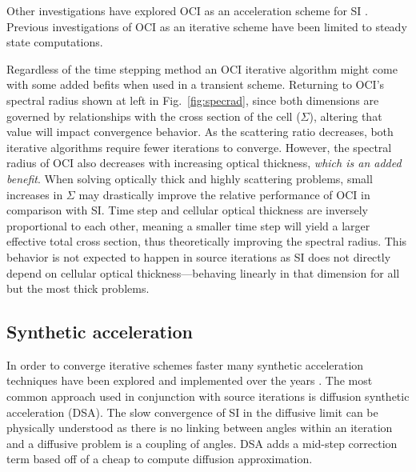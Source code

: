Other investigations have explored OCI as an acceleration scheme for SI \cite{anistratov_iterative_2015, hoagland_hybrid_2021}. %
Previous investigations of OCI as an iterative scheme have been limited to steady state computations.

Regardless of the time stepping method an OCI iterative algorithm might come with some added befits when used in a transient scheme.
Returning to OCI's spectral radius shown at left in Fig.~\ref{fig:specrad}, since both dimensions are governed by relationships with the cross section of the cell ($\Sigma$), altering that value will impact convergence behavior. 
As the scattering ratio decreases, both iterative algorithms require fewer iterations to converge.
However, the spectral radius of OCI also decreases with increasing optical thickness, \textit{which is an added benefit}.
When solving optically thick and highly scattering problems, small increases in $\Sigma$ may drastically improve the relative performance of OCI in comparison with SI.
Time step and cellular optical thickness are inversely proportional to each other, meaning a smaller time step will yield a larger effective total cross section, thus theoretically improving the spectral radius.
This behavior is not expected to happen in source iterations as SI does not directly depend on cellular optical thickness---behaving linearly in that dimension for all but the most thick problems.

\subsection{Synthetic acceleration}
\label{sec:syn_acc}
In order to converge iterative schemes faster many synthetic acceleration techniques have been explored and implemented over the years \cite{adams_fast_2002}.
The most common approach used in conjunction with source iterations is diffusion synthetic acceleration (DSA)\cite{adams_fast_2002}.
The slow convergence of SI in the diffusive limit can be physically understood as there is no linking between angles within an iteration and a diffusive problem is a coupling of angles.
DSA adds a mid-step correction term based off of a cheap to compute diffusion approximation.

